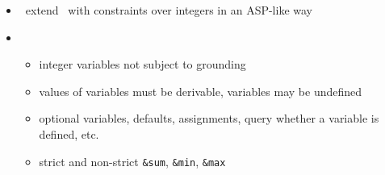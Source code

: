 \begin{frame}{\fclingo}
  \begin{itemize}
  \item {} \ extend \clingo\ with constraints over integers in an ASP-like way
  \item {} \
    \begin{itemize}
    \item integer variables not subject to grounding
    \item values of variables must be derivable, variables may be undefined
    \item optional variables, defaults, assignments, query whether a variable is defined, etc.
    \item strict and non-strict \lstinline{&sum}, \lstinline{&min}, \lstinline{&max}
    \end{itemize}
  \end{itemize}
\end{frame}
%

